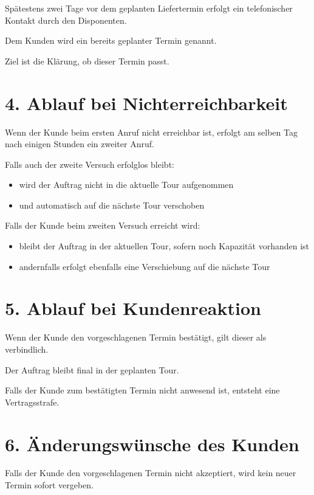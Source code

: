 \documentclass[a4paper,11pt]{article}
\begin{document}
	Spätestens zwei Tage vor dem geplanten Liefertermin erfolgt ein telefonischer Kontakt durch den Disponenten.
	
	Dem Kunden wird ein bereits geplanter Termin genannt.
	
	Ziel ist die Klärung, ob dieser Termin passt.
	
	\section*{4. Ablauf bei Nichterreichbarkeit}
	
	Wenn der Kunde beim ersten Anruf nicht erreichbar ist, erfolgt am selben Tag nach einigen Stunden ein zweiter Anruf.
	
	Falls auch der zweite Versuch erfolglos bleibt:
	
	\begin{itemize}[leftmargin=1.2cm]
		\item wird der Auftrag nicht in die aktuelle Tour aufgenommen
		\item und automatisch auf die nächste Tour verschoben
	\end{itemize}
	
	Falls der Kunde beim zweiten Versuch erreicht wird:
	
	\begin{itemize}[leftmargin=1.2cm]
		\item bleibt der Auftrag in der aktuellen Tour, sofern noch Kapazität vorhanden ist
		\item andernfalls erfolgt ebenfalls eine Verschiebung auf die nächste Tour
	\end{itemize}
	
	\section*{5. Ablauf bei Kundenreaktion}
	
	Wenn der Kunde den vorgeschlagenen Termin bestätigt, gilt dieser als verbindlich.
	
	Der Auftrag bleibt final in der geplanten Tour.
	
	Falls der Kunde zum bestätigten Termin nicht anwesend ist, entsteht eine Vertragsstrafe.
	
	\section*{6. Änderungswünsche des Kunden}
	
	Falls der Kunde den vorgeschlagenen Termin nicht akzeptiert, wird kein neuer Termin sofort vergeben.
	
\end{document}
